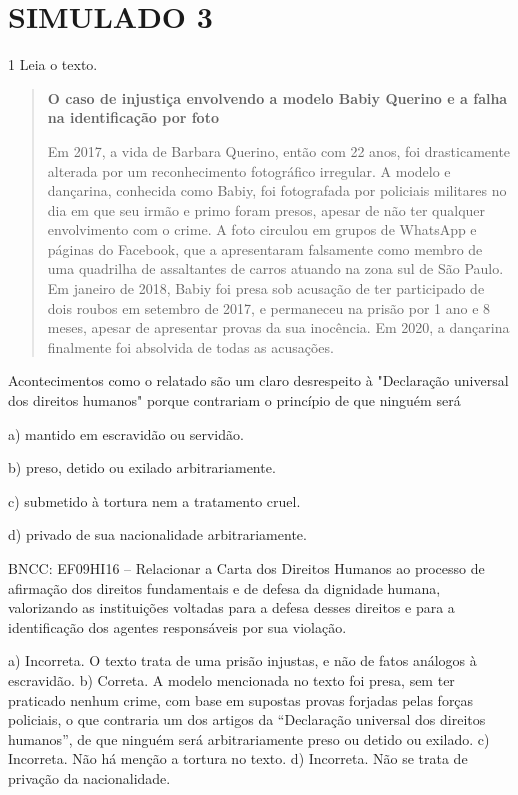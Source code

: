 \chapter{SIMULADO 3}

\num{1} Leia o texto.

\begin{quote}
\textbf{O caso de injustiça envolvendo a modelo Babiy Querino e a falha na identificação por foto}

Em 2017, a vida de Barbara Querino, então com 22 anos, foi drasticamente alterada por um reconhecimento 
fotográfico irregular. A modelo e dançarina, conhecida como Babiy, foi fotografada por policiais militares 
no dia em que seu irmão e primo foram presos, apesar de não ter qualquer envolvimento com o crime. A foto 
circulou em grupos de WhatsApp e páginas do Facebook, que a apresentaram falsamente como membro de uma 
quadrilha de assaltantes de carros atuando na zona sul de São Paulo. Em janeiro de 2018, Babiy foi presa 
sob acusação de ter participado de dois roubos em setembro de 2017, e permaneceu na prisão por 1 ano e 8 
meses, apesar de apresentar provas da sua inocência. Em 2020, a dançarina finalmente foi absolvida de todas 
as acusações.

\end{quote}

Acontecimentos como o relatado são um claro desrespeito à "Declaração
universal dos direitos humanos" porque contrariam o princípio de que ninguém será

a)  mantido em escravidão ou servidão.

b)  preso, detido ou exilado arbitrariamente.

c)  submetido à tortura nem a tratamento cruel.

d)  privado de sua nacionalidade arbitrariamente.

BNCC: EF09HI16 -- Relacionar a Carta dos Direitos Humanos ao processo de
afirmação dos direitos fundamentais e de defesa da dignidade humana,
valorizando as instituições voltadas para a defesa desses direitos e
para a identificação dos agentes responsáveis por sua violação.

a) Incorreta. O texto trata de uma prisão injustas, e não de fatos
análogos à escravidão.
b) Correta. A modelo mencionada no texto foi presa, sem ter praticado
nenhum crime, com base em supostas provas forjadas pelas forças policiais, o
que contraria um dos artigos da ``Declaração universal dos direitos
humanos'', de que ninguém será arbitrariamente preso ou detido ou
exilado.
c) Incorreta. Não há menção a tortura no texto.
d) Incorreta. Não se trata de privação da nacionalidade.


